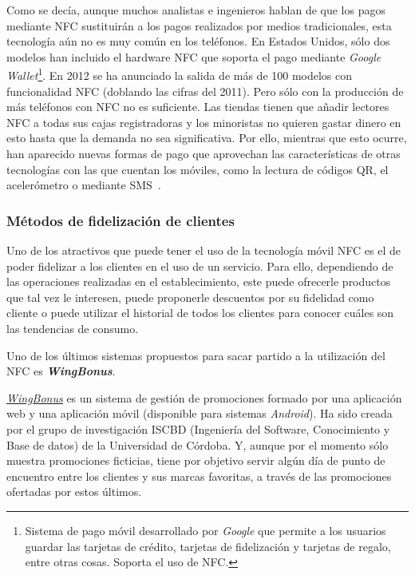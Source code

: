   Como se decía, aunque muchos analistas e ingenieros hablan de que los 
  pagos mediante \acs{NFC} sustituirán a los pagos realizados por medios
  tradicionales, esta tecnología aún no es muy común en los teléfonos. En
  Estados Unidos, sólo dos modelos han incluido el hardware \acs{NFC}
  que soporta el pago mediante \emph{Google Wallet}\footnote{Sistema de pago 
  móvil desarrollado por \emph{Google} que permite a los usuarios guardar las 
  tarjetas de crédito, tarjetas de fidelización y tarjetas de regalo, entre 
  otras cosas. Soporta el uso de \acs{NFC}.}. En 2012 se ha anunciado
  la salida de más de 100 modelos con funcionalidad \acs{NFC} (doblando las 
  cifras del 2011). Pero sólo con la producción de más teléfonos con \acs{NFC} 
  no es suficiente. Las tiendas tienen que añadir lectores \acs{NFC} a todas
  sus cajas registradoras y los minoristas no quieren gastar dinero en esto
  hasta que la demanda no sea significativa. Por ello, mientras que esto 
  ocurre, han aparecido nuevas formas de pago que aprovechan las 
  características de otras tecnologías con las que cuentan los móviles, como 
  la lectura de códigos \acs{QR}, el acelerómetro o mediante
  \acs{SMS}~\cite{bib:noWaiting}.

    \subsubsection{Métodos de fidelización de clientes}
  Uno de los atractivos que puede tener el uso de la tecnología móvil \acs{NFC}
  es el de poder fidelizar a los clientes en el uso de un servicio. Para ello,
  dependiendo de las operaciones realizadas en el
  establecimiento, este puede ofrecerle productos que tal vez le interesen,
  puede proponerle descuentos por su fidelidad como cliente o puede utilizar
  el historial de todos los clientes para conocer cuáles son las tendencias
  de consumo.
  
  Uno de los últimos sistemas propuestos para sacar 
  partido a la utilización del \acs{NFC} es \emph{\textbf{WingBonus}}.

  \emph{\href{http://wingbonus.com/}{WingBonus}} es un sistema de
  gestión de promociones formado por una aplicación web y una aplicación móvil
  (disponible para sistemas \emph{Android}). Ha sido creada por el grupo de 
  investigación ISCBD (Ingeniería del Software, Conocimiento y Base de datos) 
  de la Universidad de Córdoba. Y, aunque por el momento sólo muestra 
  promociones ficticias, tiene por objetivo servir algún día de punto de 
  encuentro entre los clientes y sus marcas favoritas, a través de las 
  promociones ofertadas por estos últimos.
  
